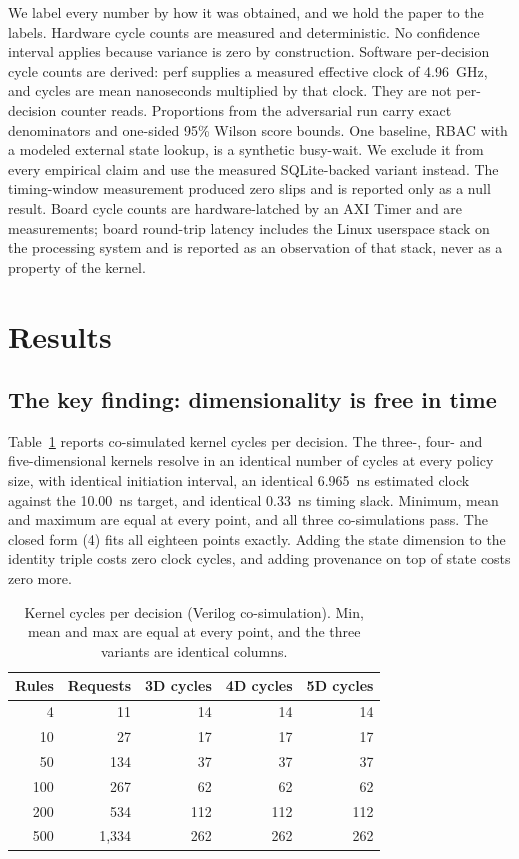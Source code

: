 \documentclass[conference]{IEEEtran}
\newcommand{\new}[1]{\textcolor{hkred}{#1}}
\begin{document}
We label every number by how it was obtained, and we hold the paper to the labels. Hardware cycle counts are measured and deterministic. No confidence interval applies because variance is zero by construction. Software per-decision cycle counts are derived: perf supplies a measured effective clock of 4.96~GHz, and cycles are mean nanoseconds multiplied by that clock. They are not per-decision counter reads. Proportions from the adversarial run carry exact denominators and one-sided 95\% Wilson score bounds. One baseline, RBAC with a modeled external state lookup, is a synthetic busy-wait. We exclude it from every empirical claim and use the measured SQLite-backed variant instead. The timing-window measurement produced zero slips and is reported only as a null result. \new{Board cycle counts are hardware-latched by an AXI Timer and are measurements; board round-trip latency includes the Linux userspace stack on the processing system and is reported as an observation of that stack, never as a property of the kernel.}

\section{Results}

\subsection{The key finding: dimensionality is free in time}

Table~\ref{tab:cycles} reports co-simulated kernel cycles per decision. The \new{three-, }four- and five-dimensional kernels resolve in an identical number of cycles at every policy size, with identical initiation interval, \new{an identical 6.965~ns estimated clock against the 10.00~ns target, }and identical 0.33~ns timing slack. Minimum, mean and maximum are equal at every point\new{, and all three co-simulations pass}. The closed form (4) fits all \new{eighteen} points exactly. \new{Adding the state dimension to the identity triple costs zero clock cycles, and adding provenance on top of state costs zero more.}

\begin{table}[t]
\caption{Kernel cycles per decision (Verilog co-simulation). Min, mean and max are equal at every point, and the \new{three} variants are identical columns.}
\label{tab:cycles}
\centering
\begin{tabular}{rrrrr}
\toprule
Rules & Requests & \new{3D cycles} & 4D cycles & 5D cycles \\
\midrule
4 & 11 & \new{14} & 14 & 14 \\
10 & 27 & \new{17} & 17 & 17 \\
50 & 134 & \new{37} & 37 & 37 \\
100 & 267 & \new{62} & 62 & 62 \\
200 & 534 & \new{112} & 112 & 112 \\
500 & 1{,}334 & \new{262} & 262 & 262 \\
\bottomrule
\end{tabular}
\end{table}
\end{document}
